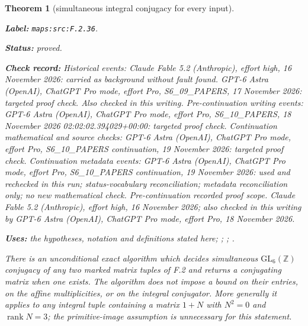\documentclass[11pt,a4paper]{article}
\newtheorem{theorem}{Theorem}[section]
\theoremstyle{definition}
\newcommand{\StatementRecord}[4]{\par\smallskip\begingroup\upshape\raggedright\noindent\textbf{Label:} \nolinkurl{#1}.\par\noindent\textbf{Status:} #2.\par\noindent\textbf{Check record:} #3.\par\noindent\textbf{Uses:} #4.\par\endgroup\smallskip}
\begin{document}
\begin{theorem}[simultaneous integral conjugacy for every input]\label{maps:src:F.2.36}
\StatementRecord{maps:src:F.2.36}{proved}{Historical events: Claude Fable 5.2 (Anthropic), effort high, 16 November 2026: carried as background without fault found. GPT-6 Astra (OpenAI), ChatGPT Pro mode, effort Pro, S6\_09\_PAPERS, 17 November 2026: targeted proof check. Also checked in this writing. Pre-continuation writing events: GPT-6 Astra (OpenAI), ChatGPT Pro mode, effort Pro, S6\_10\_PAPERS, 18 November 2026 02:02:02.394029+00:00: targeted proof check. Continuation mathematical and source checks: GPT-6 Astra (OpenAI), ChatGPT Pro mode, effort Pro, S6\_10\_PAPERS continuation, 19 November 2026: targeted proof check. Continuation metadata events: GPT-6 Astra (OpenAI), ChatGPT Pro mode, effort Pro, S6\_10\_PAPERS continuation, 19 November 2026: used and rechecked in this run; status-vocabulary reconciliation; metadata reconciliation only; no new mathematical check. \emph{Pre-continuation recorded proof scope.} Claude Fable 5.2 (Anthropic), effort high, 16 November 2026; also checked in this writing by GPT-6 Astra (OpenAI), ChatGPT Pro mode, effort Pro, 18 November 2026}{the hypotheses, notation and definitions stated here; \cite[Algorithm 8.3, p.~21]{rootBHJ22}; \cite[Algorithm 8.3 and its correctness proof, p.~21]{rootBHJ22}; \cite[Theorem 3.4, p.~6; Propositions 8.1--8.2, p.~21]{rootBHJ22}}


There is an unconditional exact algorithm which decides simultaneous
$\mathrm{GL}_6(\mathbb Z)$ conjugacy of any two marked matrix tuples of
F.2 and returns a conjugating matrix when one exists. The algorithm
does not impose a bound on their entries, on the affine multiplicities,
or on the integral conjugator. More generally it applies to any integral
tuple containing a matrix $1+N$ with $N^2=0$ and $\operatorname{rank}N=3$;
the primitive-image assumption is unnecessary for this statement.

\end{theorem}
\end{document}
